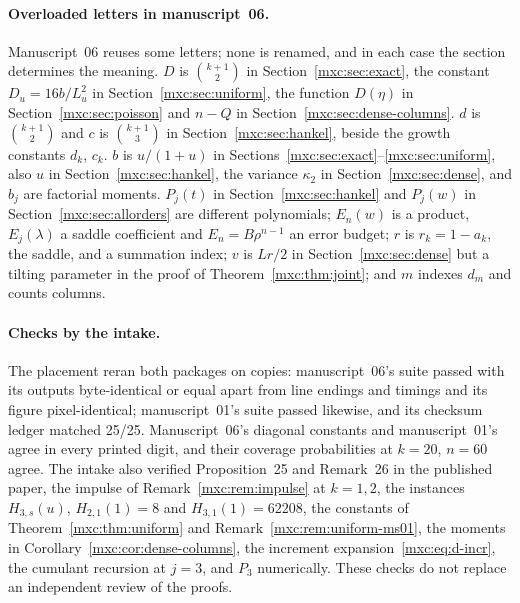 \documentclass[11pt]{article}
\numberwithin{equation}{section}
\theoremstyle{definition}
\theoremstyle{remark}
\begin{document}
\paragraph{Overloaded letters in manuscript~06.} Manuscript~06 reuses some
letters; none is renamed, and in each case the section determines the
meaning. $D$ is $\binom{k+1}2$ in Section~\ref{mxc:sec:exact}, the constant
$D_u=16b/L_u^2$ in Section~\ref{mxc:sec:uniform}, the function $D(\eta)$ in
Section~\ref{mxc:sec:poisson} and $n-Q$ in
Section~\ref{mxc:sec:dense-columns}. $d$ is $\binom{k+1}2$ and $c$ is
$\binom{k+1}3$ in Section~\ref{mxc:sec:hankel}, beside the growth
constants $d_k$, $c_k$. $b$ is $u/(1+u)$ in
Sections~\ref{mxc:sec:exact}--\ref{mxc:sec:uniform}, also $u$ in
Section~\ref{mxc:sec:hankel}, the variance $\kappa_2$ in
Section~\ref{mxc:sec:dense}, and $b_j$ are factorial moments.
$P_j(t)$ in Section~\ref{mxc:sec:hankel} and $P_j(w)$ in
Section~\ref{mxc:sec:allorders} are different polynomials; $E_n(w)$ is a
product, $E_j(\lambda)$ a saddle coefficient and $E_n=B\rho^{n-1}$ an error
budget; $r$ is $r_k=1-a_k$, the saddle, and a summation index; $v$ is $Lr/2$
in Section~\ref{mxc:sec:dense} but a tilting parameter in the proof of
Theorem~\ref{mxc:thm:joint}; and $m$ indexes $d_m$ and counts columns.

\paragraph{Checks by the intake.} The placement reran both packages on
copies: manuscript~06's suite passed with its outputs byte-identical or
equal apart from line endings and timings and its figure pixel-identical;
manuscript~01's suite passed likewise, and its checksum ledger matched
25/25. Manuscript~06's diagonal constants and manuscript~01's agree in
every printed digit, and their coverage probabilities at $k=20$, $n=60$
agree. The intake also verified Proposition~25 and Remark~26 in the
published paper, the impulse of Remark~\ref{mxc:rem:impulse} at $k=1,2$,
the instances $H_{3,s}(u)$, $H_{2,1}(1)=8$ and $H_{3,1}(1)=62208$, the
constants of Theorem~\ref{mxc:thm:uniform} and
Remark~\ref{mxc:rem:uniform-ms01}, the moments in
Corollary~\ref{mxc:cor:dense-columns}, the increment
expansion~\eqref{mxc:eq:d-incr}, the cumulant recursion at $j=3$, and
$P_3$ numerically. These checks do not replace an independent review of
the proofs.
\end{document}
